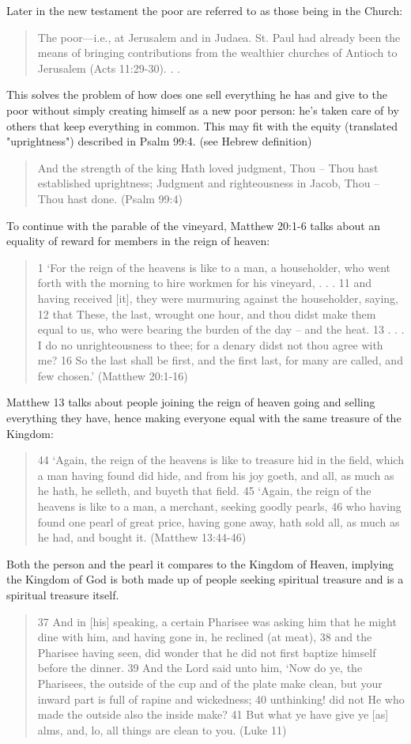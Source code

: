 \documentclass[11pt]{article}
\begin{document}
Later in the new testament the poor are referred to as those being in the Church:
\begin{quote}
The poor—i.e., at Jerusalem and in Judaea. St. Paul had already been the means of bringing contributions from the wealthier churches of Antioch to Jerusalem (Acts 11:29-30). . . \cite{the poor}
\end{quote}
 This solves the problem of how does one sell everything he has and give to the poor without simply creating himself as a new poor person: he's taken care of by others that keep everything in common. This may fit with the equity (translated "uprightness") described in Psalm 99:4. (see Hebrew definition) %
\begin{quote}
And the strength of the king Hath loved judgment, Thou -- Thou hast established uprightness; Judgment and righteousness in Jacob, Thou -- Thou hast done. (Psalm 99:4) 
\end{quote}
To continue with the parable of the vineyard, Matthew 20:1-6 talks about an equality of reward for members in the reign of heaven:
\begin{quote}
1 `For the reign of the heavens is like to a man, a householder, who went forth with the morning to hire workmen for his vineyard, . . . 11 and having received [it], they were murmuring against the householder, saying, 12 that These, the last, wrought one hour, and thou didst make them equal to us, who were bearing the burden of the day -- and the heat. 13 . . . I do no unrighteousness to thee; for a denary didst not thou agree with me? 16 So the last shall be first, and the first last, for many are called, and few chosen.' (Matthew 20:1-16)
\end{quote}
Matthew 13 talks about people joining the reign of heaven going and selling everything they have, hence making everyone equal with the same treasure of the Kingdom:
\begin{quote}
44 `Again, the reign of the heavens is like to treasure hid in the field, which a man having found did hide, and from his joy goeth, and all, as much as he hath, he selleth, and buyeth that field. 45 `Again, the reign of the heavens is like to a man, a merchant, seeking goodly pearls, 46 who having found one pearl of great price, having gone away, hath sold all, as much as he had, and bought it. (Matthew 13:44-46)
\end{quote}
Both the person and the pearl it compares to the Kingdom of Heaven, implying the Kingdom of God is both made up of people seeking spiritual treasure and is a spiritual treasure itself. 
\begin{quote}
37 And in [his] speaking, a certain Pharisee was asking him that he might dine with him, and having gone in, he reclined (at meat),
38 and the Pharisee having seen, did wonder that he did not first baptize himself before the dinner.
39 And the Lord said unto him, `Now do ye, the Pharisees, the outside of the cup and of the plate make clean, but your inward part is full of rapine and wickedness;
40 unthinking! did not He who made the outside also the inside make?
41 But what ye have give ye [as] alms, and, lo, all things are clean to you. (Luke 11)
\end{quote}
\end{document}
